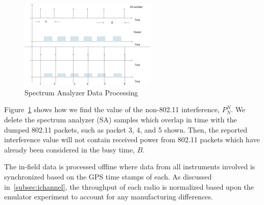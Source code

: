 \begin{figure}
\vspace{-0.1in}
\centering
\includegraphics[width=65mm]{figure/sa_process}
\vspace{-0.1in}
\caption{Spectrum Analyzer Data Processing}
\label{fig:sa_process}
\end{figure}

Figure~\ref{fig:sa_process} shows how we find the value of the
non-802.11 interference, $P_N^N$. We delete the spectrum analyzer
(SA) samples which overlap in time with the dumped 802.11 packets,
such as packet 3, 4, and 5 shown. Then, the reported interference value
will not contain received power from 802.11 packets which have already
been considered in the busy time, $B$.

The in-field data is processed offline where data from all instruments
involved is synchronized based on the GPS time stamps of each. 
As discussed in~\ref{subsec:ichannel}, the throughput of each radio
is normalized based upon the emulator experiment to account for any
manufacturing differences.

